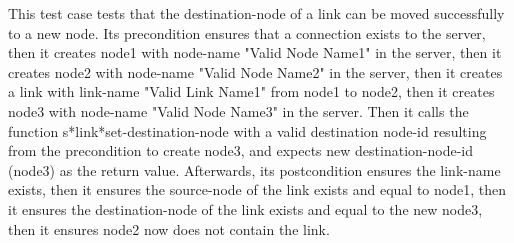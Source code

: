 This test case tests that the destination-node of a link can be moved successfully to a new node.
Its precondition ensures that a connection exists to the server, then it creates node1 with node-name "Valid Node Name1" in the server, then it creates node2 with node-name  "Valid Node Name2" in the server, then it creates a link with link-name "Valid Link Name1" from node1 to node2, then it creates node3 with node-name "Valid Node Name3" in the server.
Then it calls the function s*link*set-destination-node  with a valid destination node-id resulting from the precondition to create node3, and expects new destination-node-id (node3) as the return value.
Afterwards, its postcondition ensures the link-name exists, then it ensures the source-node of the link exists and equal to node1, then it ensures the destination-node of the link exists and equal to the new node3, then it ensures node2 now does not contain the link.

\

